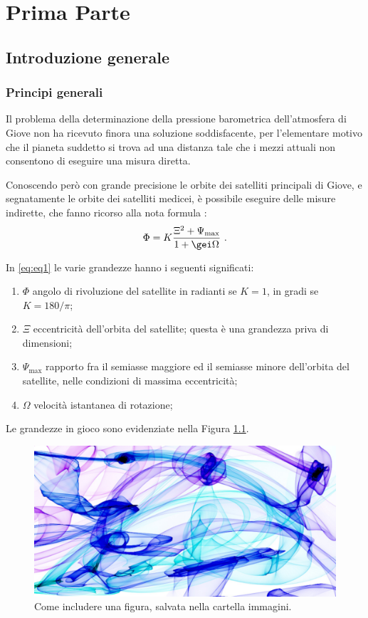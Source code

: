 \documentclass[%
	corpo=11pt,
    twoside,
    stile=classica,
    oldstyle,
    tipotesi=custom,
    greek,
    evenboxes,
]{toptesi}
\begin{document}
{\part{Prima Parte}

\chapter{Introduzione generale}

\section{Principi generali}
Il problema della determinazione della pressione barometrica dell'atmosfera di Giove non ha ricevuto finora una soluzione soddisfacente, per l'elementare motivo che il pianeta suddetto si trova ad una distanza tale che i mezzi attuali non consentono di eseguire una misura diretta.

Conoscendo per\`o con grande precisione le orbite dei satelliti principali di Giove, e segnatamente le orbite dei satelliti medicei, \`e possibile eseguire delle misure indirette, che fanno ricorso alla nota formula \cite{gal}:
\begin{equation} \label{eq:eq1}
\Phi = K\frac{\Xi^2 +\Psi_\mathrm{max}}{1+\gei\Omega}\ .
\end{equation}

In \eqref{eq:eq1} le varie grandezze hanno i seguenti significati:
\begin{enumerate}
\item $\Phi$ angolo di rivoluzione del satellite in radianti se $K=1$, in gradi se $K=180/\pi$;
\item $\Xi$ eccentricit\`a dell'orbita del satellite; questa \`e una grandezza priva di dimensioni;
\item $\Psi_\mathrm{max}$ rapporto fra il semiasse maggiore ed il semiasse minore dell'orbita del satellite, nelle condizioni di massima eccentricit\`a;
\item $\Omega$ velocit\`a istantanea di rotazione; 
\end{enumerate}

Le grandezze in gioco sono evidenziate nella Figura \ref{fig:figura}.
\begin{figure}[htb]\centering
\includegraphics[scale=0.1]{Pictures/FlameArtwork2}
\caption{Come includere una figura, salvata nella cartella immagini.}\label{fig:figura}
\end{figure}




}
\end{document}
